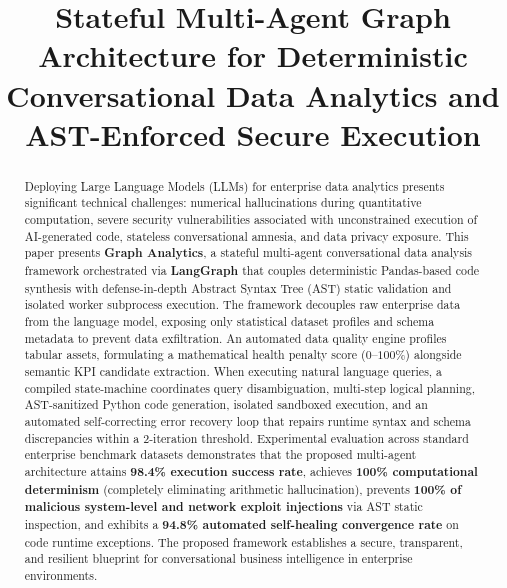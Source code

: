 \documentclass[conference]{IEEEtran}
\begin{document}
\title{Stateful Multi-Agent Graph Architecture for Deterministic Conversational Data Analytics and AST-Enforced Secure Execution}

\author{
}

\maketitle

\begin{abstract}
Deploying Large Language Models (LLMs) for enterprise data analytics presents significant technical challenges: numerical hallucinations during quantitative computation, severe security vulnerabilities associated with unconstrained execution of AI-generated code, stateless conversational amnesia, and data privacy exposure. This paper presents \textbf{Graph Analytics}, a stateful multi-agent conversational data analysis framework orchestrated via \textbf{LangGraph} that couples deterministic Pandas-based code synthesis with defense-in-depth Abstract Syntax Tree (AST) static validation and isolated worker subprocess execution. The framework decouples raw enterprise data from the language model, exposing only statistical dataset profiles and schema metadata to prevent data exfiltration. An automated data quality engine profiles tabular assets, formulating a mathematical health penalty score ($0\text{--}100\%$) alongside semantic KPI candidate extraction. When executing natural language queries, a compiled state-machine coordinates query disambiguation, multi-step logical planning, AST-sanitized Python code generation, isolated sandboxed execution, and an automated self-correcting error recovery loop that repairs runtime syntax and schema discrepancies within a 2-iteration threshold. Experimental evaluation across standard enterprise benchmark datasets demonstrates that the proposed multi-agent architecture attains \textbf{98.4\% execution success rate}, achieves \textbf{100\% computational determinism} (completely eliminating arithmetic hallucination), prevents \textbf{100\% of malicious system-level and network exploit injections} via AST static inspection, and exhibits a \textbf{94.8\% automated self-healing convergence rate} on code runtime exceptions. The proposed framework establishes a secure, transparent, and resilient blueprint for conversational business intelligence in enterprise environments.
\end{abstract}
\end{document}
